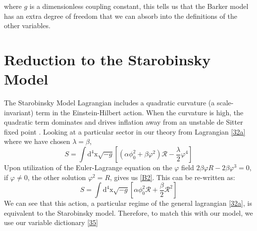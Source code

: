 \documentclass[aps,prd,reprint,preprintnumbers,showpacs,floatfix,nofootinbib,superscript address]{revtex4-2}
\begin{document}
where $g$ is a dimensionless coupling constant, this tells us that the Barker model has an extra degree of freedom that we can absorb into the definitions of the other variables.

\section{Reduction to the Starobinsky Model} \label{Appendix B}

The Starobinsky Model \cite{STAROBINSKY198099} Lagrangian includes a quadratic curvature (a scale-invariant) term in the Einstein-Hilbert action. When the curvature is high, the quadratic term dominates and drives inflation away from an unstable de Sitter fixed point \cite{Cecchini_2024}. Looking at a particular sector in our theory from Lagrangian \ref{32a} where we have chosen $\lambda = \beta$,
\begin{equation} \label{B1}
    S =\int \text{d}^4\text{x} \sqrt{-g} \left[ (\alpha \phi_0^2 + \beta \varphi^2)\mathcal{R} - \frac{\lambda}{2} \varphi^4 \right]  
\end{equation}
Upon utilization of the Euler-Lagrange equation on the $\varphi$ field $2 \beta \varphi R - 2\beta \varphi^3 = 0$, if $\varphi \neq 0$, the other solution $\varphi^2 = R$, gives us \ref{B2}. This can be re-written as:
\begin{equation} \label{B2}
    S =\int \text{d}^4\text{x} \sqrt{-g} \left[ \alpha \phi_0^2 \mathcal{R} + \frac{\beta}{2} \mathcal{R}^2  \right]
\end{equation}
 We can see that this action, a particular regime of the general lagrangian \ref{32a}, is equivalent to the Starobinsky model. Therefore, to match this with our model, we use our variable dictionary \ref{35}
\end{document}
